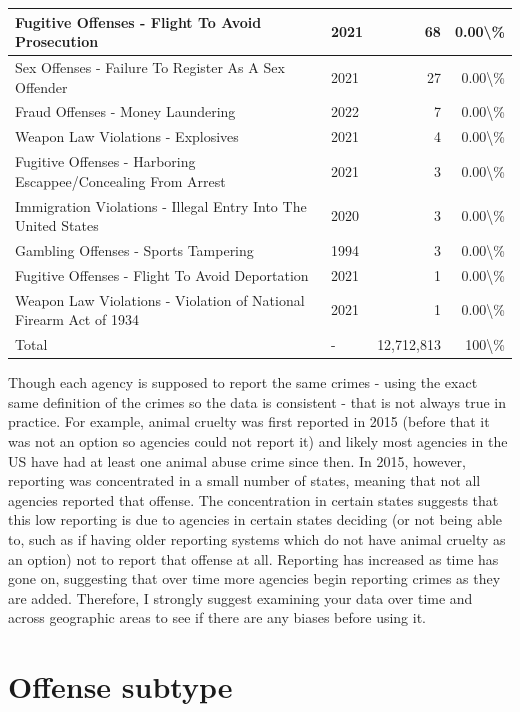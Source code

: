 \documentclass[
]{krantz}
\begin{document}
\begin{longtable}[t]{l|l|r|r}
\hline
Fugitive Offenses - Flight To Avoid Prosecution & 2021 & 68 & 0.00\textbackslash{}\%\\
\hline
Sex Offenses - Failure To Register As A Sex Offender & 2021 & 27 & 0.00\textbackslash{}\%\\
\hline
Fraud Offenses - Money Laundering & 2022 & 7 & 0.00\textbackslash{}\%\\
\hline
Weapon Law Violations - Explosives & 2021 & 4 & 0.00\textbackslash{}\%\\
\hline
Fugitive Offenses - Harboring Escappee/Concealing From Arrest & 2021 & 3 & 0.00\textbackslash{}\%\\
\hline
Immigration Violations - Illegal Entry Into The United States & 2020 & 3 & 0.00\textbackslash{}\%\\
\hline
Gambling Offenses - Sports Tampering & 1994 & 3 & 0.00\textbackslash{}\%\\
\hline
Fugitive Offenses - Flight To Avoid Deportation & 2021 & 1 & 0.00\textbackslash{}\%\\
\hline
Weapon Law Violations - Violation of National Firearm Act of 1934 & 2021 & 1 & 0.00\textbackslash{}\%\\
\hline
Total & - & 12,712,813 & 100\textbackslash{}\%\\
\hline
\end{longtable}

Though each agency is supposed to report the same crimes -
using the exact same definition of the crimes so the data is
consistent - that is not always true in practice. For
example, animal cruelty was first reported in 2015 (before
that it was not an option so agencies could not report it)
and likely most agencies in the US have had at least one
animal abuse crime since then. In 2015, however, reporting
was concentrated in a small number of states, meaning that
not all agencies reported that offense. The concentration in
certain states suggests that this low reporting is due to
agencies in certain states deciding (or not being able to,
such as if having older reporting systems which do not have
animal cruelty as an option) not to report that offense at
all. Reporting has increased as time has gone on, suggesting
that over time more agencies begin reporting crimes as they
are added. Therefore, I strongly suggest examining your data
over time and across geographic areas to see if there are
any biases before using it.

\section{Offense subtype}\label{offense-subtype}
\end{document}
